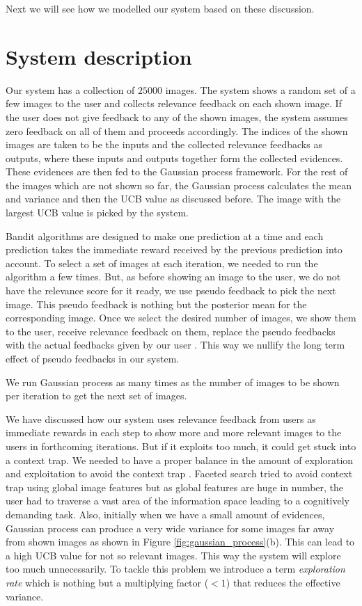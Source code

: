 \documentclass[english]{tktltiki}
\begin{document}
Next we will see how we modelled our system based on these discussion.



\section{System description}

Our system has a collection of $25000$ images. The system \cite{re_qlir} shows a random set of a few images to the user and collects relevance feedback on each shown image. If the user does not give feedback to any of the shown images, the system assumes zero feedback on all of them and proceeds accordingly. The indices of the shown images are taken to be the inputs and the collected relevance feedbacks as outputs, where these inputs and outputs together form the collected evidences. These evidences are then fed to the Gaussian process framework. For the rest of the images which are not shown so far, the Gaussian process calculates the mean and variance and then the UCB value as discussed before. The image with the largest UCB value is picked by the system.

Bandit algorithms are designed to make one prediction at a time and each prediction takes the immediate reward received by the previous prediction into account. To select a set of images at each iteration, we needed to run the algorithm a few times. But, as before showing an image to the user, we do not have the relevance score for it ready, we use pseudo feedback to pick the next image. This pseudo feedback is nothing but the posterior mean for the corresponding image. Once we select the desired number of images, we show them to the user, receive relevance feedback on them, replace the pseudo feedbacks with the actual feedbacks given by our user \cite{imse}. This way we nullify the long term effect of pseudo feedbacks in our system.

We run Gaussian process as many times as the number of images to be shown per iteration to get the next set of images.

We have discussed how our system uses relevance feedback from users as immediate rewards in each step to show more and more relevant images to the users in forthcoming iterations. But if it exploits too much, it could get stuck into a context trap. We needed to have a proper balance in the amount of exploration and exploitation to avoid the context trap \cite{dir_expl_search, cbir_multinomial_rel_feed, iter_rel_feed}. Faceted search \cite{faceted_search_1, faceted_search_2} tried to avoid context trap using global image features but as global features are huge in number, the user had to traverse a vast area of the information space \cite{info_space} leading to a cognitively demanding task. Also, initially when we have a small amount of evidences, Gaussian process can produce a very wide variance for some images far away from shown images as shown in Figure \ref{fig:gaussian_process}(b). This can lead to a high UCB value for not so relevant images. This way the system will explore too much unnecessarily. To tackle this problem we introduce a term \textit{exploration rate} which is nothing but a multiplying factor ($<1$) that reduces the effective variance.
\end{document}
